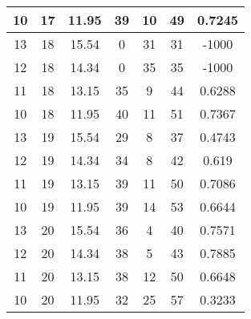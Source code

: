 \documentclass[letterpaper, 12pt]{article}
\begin{document}
\begin{longtable}{|c|c|c|c|c|c|c|}
10 & 17 & 11.95 & 39 & 10 & 49 & 0.7245 \\
\hline
13 & 18 & 15.54 & 0 & 31 & 31 & -1000 \\
\hline
12 & 18 & 14.34 & 0 & 35 & 35 & -1000 \\
\hline
11 & 18 & 13.15 & 35 & 9 & 44 & 0.6288 \\
\hline
10 & 18 & 11.95 & 40 & 11 & 51 & 0.7367 \\
\hline
13 & 19 & 15.54 & 29 & 8 & 37 & 0.4743 \\
\hline
12 & 19 & 14.34 & 34 & 8 & 42 & 0.619 \\
\hline
11 & 19 & 13.15 & 39 & 11 & 50 & 0.7086 \\
\hline
10 & 19 & 11.95 & 39 & 14 & 53 & 0.6644 \\
\hline
13 & 20 & 15.54 & 36 & 4 & 40 & 0.7571 \\
\hline
12 & 20 & 14.34 & 38 & 5 & 43 & 0.7885 \\
\hline
11 & 20 & 13.15 & 38 & 12 & 50 & 0.6648 \\
\hline
10 & 20 & 11.95 & 32 & 25 & 57 & 0.3233 \\
\hline
\end{longtable}
\end{document}
